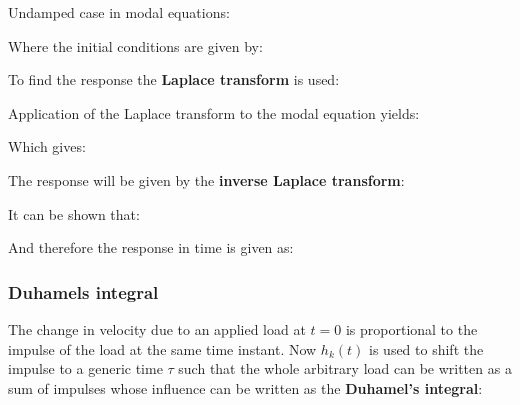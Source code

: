 \documentclass[10pt,a4paper]{scrartcl}
\begin{document}
\begin{multicols*}{2}
Undamped case in modal equations:


Where the initial conditions are given by:


To find the response the \textbf{Laplace transform} is used:


Application of the Laplace transform to the modal equation yields:


Which gives:


The response will be given by the \textbf{inverse Laplace transform}:


It can be shown that:


And therefore the response in time is given as:


\subsubsection{Duhamels integral}


The change in velocity due to an applied load at $t=0$ is proportional to the impulse of the load at the same time instant. Now $h_k(t)$ is used to shift the impulse to a generic time $\tau$ such that the whole arbitrary load can be written as a sum of impulses whose influence can be written as the \textbf{Duhamel's integral}:


\end{multicols*}
\end{document}
